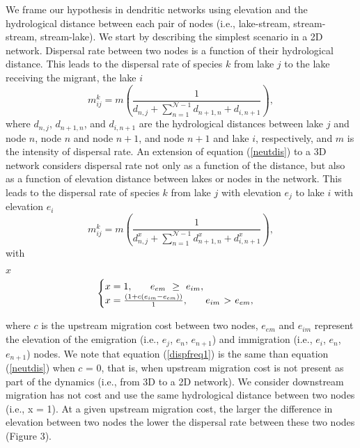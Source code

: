 \documentclass[11pt]{article}
\begin{document}
{We frame our hypothesis in dendritic networks using elevation and the
hydrological distance between each pair of nodes (i.e., lake-stream,
stream-stream, stream-lake). We start by describing the simplest
scenario in a 2D network. Dispersal rate between two nodes is a
function of their hydrological distance. This leads to the dispersal
rate of species $k$ from lake $j$ to the lake receiving the migrant,
the lake $i$
\begin{equation}
m^{k}_{ij} = m \left(\frac{1}{d_{n,j} + \sum\limits_{n = 1}^{\mathcal{N}-1} d_{n+1,n}+ d_{i,n+1}}\right),
\label{neutdis}
\end{equation}
where $d_{n,j}$, $d_{n+1,n}$, and $d_{i,n+1}$ are the hydrological
distances between lake $j$ and node $n$, node $n$ and node $n+1$, and
node $n+1$ and lake $i$, respectively, and $m$ is the intensity of
dispersal rate. An extension of equation (\ref{neutdis}) to a 3D
network considers dispersal rate not only as a function of the
distance, but also as a function of elevation distance between lakes
or nodes in the network. This leads to the dispersal rate of species
$k$ from lake $j$ with elevation $e_{j}$ to lake $i$ with elevation
$e_{i}$
\begin{equation}
m^{k}_{ij} = m \left(\frac{1}{d_{n,j}^{x} + \sum\limits_{n = 1}^{\mathcal{N}-1} d_{n+1,n}^{x} + d_{i,n+1}^{x}}\right),
\label{dispfreq1}
\end{equation}
with
\begin{linenomath}
$x$
\begin{equation}
\begin{cases}
x = 1, \hspace{0.25 in} e_{em} \hspace{0.05 in} \geq \hspace{0.05 in} e_{im},\\
x = \frac{(1 + c(e_{im} - e_{em}))}{1}, \hspace{0.25 in} e_{im} \hspace{0.05 in} $>$ \hspace{0.05 in} e_{em},\\
\end{cases}
\end{equation}
\end{linenomath}
where $c$ is the upstream migration cost between two nodes, $e_{em}$
and $e_{im}$ represent the elevation of the emigration (i.e., $e_{j}$,
$e_{n}$, $e_{n+1}$) and immigration (i.e., $e_{i}$, $e_{n}$,
$e_{n+1}$) nodes. We note that equation (\ref{dispfreq1}) is the same
than equation (\ref{neutdis}) when $c$ = 0, that is, when upstream
migration cost is not present as part of the dynamics (i.e., from 3D
to a 2D network). We consider downstream migration has not cost and
use the same hydrological distance between two nodes (i.e., x = 1). At
a given upstream migration cost, the larger the difference in
elevation between two nodes the lower the dispersal rate between these
two nodes (Figure 3).

}
\end{document}
